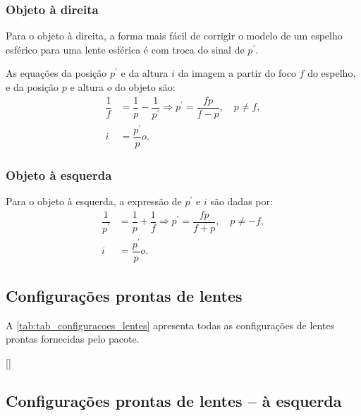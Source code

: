 \documentclass[a4paper,10pt]{article}
\begin{document}
\subsubsection{Objeto à direita}

Para o objeto à direita, a forma mais fácil de corrigir o modelo de um espelho esférico para uma lente esférica é com troca do sinal de $p^{\prime}$.

As equações da posição $p^{\prime}$ e da altura $i$ da imagem a partir do foco $f$ do espelho, e da posição $p$ e altura $o$ do objeto são:
\begin{equation}
  \begin{split}
    \dfrac{1}{f} & = \dfrac{1}{p} - \dfrac{1}{p^{\prime}} \Rightarrow p^{\prime} = \dfrac{f p}{f - p}, \quad p \neq f, \\
    i            & = \dfrac{p^{\prime}}{p} o.
  \end{split}
\end{equation}

\subsubsection{Objeto à esquerda}

Para o objeto à esquerda, a expressão de $p^{\prime}$ e $i$ são dadas por:
\begin{equation}
  \begin{split}
    \dfrac{1}{p^{\prime}} & = \dfrac{1}{p} + \dfrac{1}{f} \Rightarrow p^{\prime} = \dfrac{f p}{f + p}, \quad p \neq -f, \\
    i                     & = \dfrac{p^{\prime}}{p} o.
  \end{split}
\end{equation}

\subsection{Configurações prontas de lentes}

A \autoref{tab:tab_configuracoes_lentes} apresenta todas as configurações de lentes prontas fornecidas pelo pacote.

\begin{table}[ht]
  \centering
  [\linewidth]{
    
  }
\end{table}

\subsection{Configurações prontas de lentes -- à esquerda}
\end{document}
